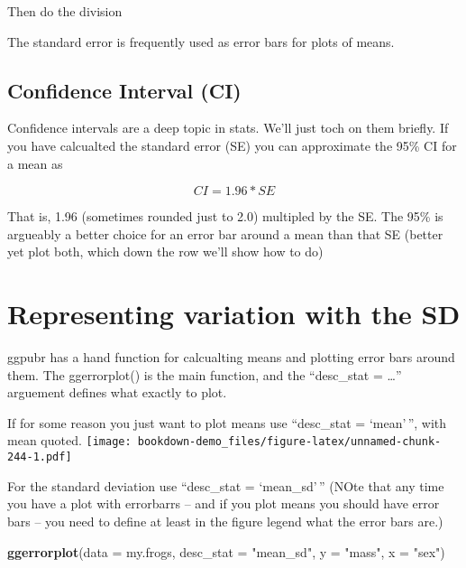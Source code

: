 \documentclass[]{book}
\newenvironment{Shaded}{\begin{snugshade}}{\end{snugshade}}
\newcommand{\KeywordTok}[1]{\textcolor[rgb]{0.13,0.29,0.53}{\textbf{#1}}}
\newcommand{\DataTypeTok}[1]{\textcolor[rgb]{0.13,0.29,0.53}{#1}}
\newcommand{\StringTok}[1]{\textcolor[rgb]{0.31,0.60,0.02}{#1}}
\newcommand{\OperatorTok}[1]{\textcolor[rgb]{0.81,0.36,0.00}{\textbf{#1}}}
\newcommand{\NormalTok}[1]{#1}
\theoremstyle{definition}
\theoremstyle{definition}
\theoremstyle{definition}
\theoremstyle{remark}
\begin{document}
\begin{Shaded}
\end{Shaded}

Then do the division

The standard error is frequently used as error bars for plots of means.

\subsection{Confidence Interval (CI)}\label{confidence-interval-ci}

Confidence intervals are a deep topic in stats. We'll just toch on them
briefly. If you have calcualted the standard error (SE) you can
approximate the 95\% CI for a mean as

\[CI = 1.96*SE\]

That is, 1.96 (sometimes rounded just to 2.0) multipled by the SE. The
95\% is argueably a better choice for an error bar around a mean than
that SE (better yet plot both, which down the row we'll show how to do)

\section{Representing variation with the
SD}\label{representing-variation-with-the-sd}

ggpubr has a hand function for calcualting means and plotting error bars
around them. The ggerrorplot() is the main function, and the
``desc\_stat = \ldots{}'' arguement defines what exactly to plot.

If for some reason you just want to plot means use ``desc\_stat =
`mean'\,'', with mean quoted.
\texttt{[image: bookdown-demo\_files/figure-latex/unnamed-chunk-244-1.pdf]}

For the standard deviation use ``desc\_stat = `mean\_sd'\,'' (NOte that
any time you have a plot with errorbarrs -- and if you plot means you
should have error bars -- you need to define at least in the figure
legend what the error bars are.)

\begin{Shaded}
\begin{Highlighting}[]
\KeywordTok{ggerrorplot}\NormalTok{(}\DataTypeTok{data =}\NormalTok{ my.frogs,}
            \DataTypeTok{desc_stat =} \StringTok{"mean_sd"}\NormalTok{,}
          \DataTypeTok{y =} \StringTok{"mass"}\NormalTok{,}
          \DataTypeTok{x =} \StringTok{"sex"}\NormalTok{)}
\end{Highlighting}
\end{Shaded}
\end{document}
